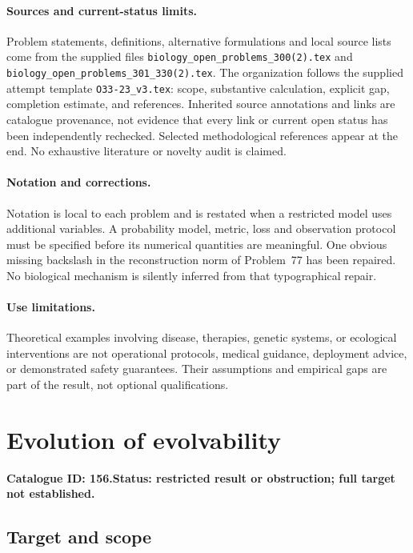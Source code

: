 \documentclass[11pt]{article}
\begin{document}
\paragraph{Sources and current-status limits.}
Problem statements, definitions, alternative formulations and local source lists
come from the supplied files
\texttt{biology\_open\_problems\_300(2).tex} and
\texttt{biology\_open\_problems\_301\_330(2).tex}.
The organization follows the supplied attempt template
\texttt{O33-23\_v3.tex}: scope, substantive calculation, explicit gap,
completion estimate, and references. Inherited source annotations and links are
catalogue provenance, not evidence that every link or current open status has
been independently rechecked. Selected methodological references appear at the
end. No exhaustive literature or novelty audit is claimed.

\paragraph{Notation and corrections.}
Notation is local to each problem and is restated when a restricted model uses
additional variables. A probability model, metric, loss and observation protocol
must be specified before its numerical quantities are meaningful. One obvious
missing backslash in the reconstruction norm of Problem~77 has been repaired.
No biological mechanism is silently inferred from that typographical repair.

\paragraph{Use limitations.}
Theoretical examples involving disease, therapies, genetic systems, or ecological
interventions are not operational protocols, medical guidance, deployment advice,
or demonstrated safety guarantees. Their assumptions and empirical gaps are part
of the result, not optional qualifications.

\setcounter{section}{155}
\section{Evolution of evolvability}
\label{prob:156}
\noindent\textbf{Catalogue ID: 156.}\quad \textbf{Status: restricted result or obstruction; full target not established.}
\subsection{Target and scope}
\end{document}
